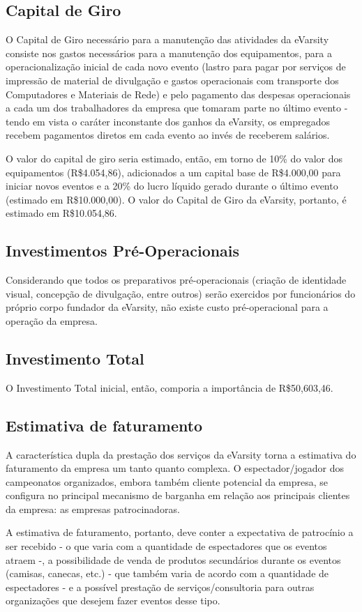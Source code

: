\documentclass[a4paper, 12pt]{paper}
\begin{document}
\subsection{Capital de Giro}
O Capital de Giro necessário para a manutenção das atividades da eVarsity consiste nos gastos necessários para a manutenção dos equipamentos, para a operacionalização inicial de cada novo evento (lastro para pagar por serviços de impressão de material de divulgação e gastos operacionais com transporte dos Computadores e Materiais de Rede) e pelo pagamento das despesas operacionais a cada um dos trabalhadores da empresa que tomaram parte no último evento - tendo em vista o caráter inconstante dos ganhos da eVarsity, os empregados recebem pagamentos diretos em cada evento ao invés de receberem salários. 

O valor do capital de giro seria estimado, então, em torno de 10\% do valor dos equipamentos (R\$4.054,86), adicionados a um capital base de R\$4.000,00 para iniciar novos eventos e a 20\% do lucro líquido gerado durante o último evento (estimado em R\$10.000,00). O valor do Capital de Giro da eVarsity, portanto, é estimado em R\$10.054,86.
\subsection{Investimentos Pré-Operacionais}
Considerando que todos os preparativos pré-operacionais (criação de identidade visual, concepção de divulgação, entre outros) serão exercidos por funcionários do próprio corpo fundador da eVarsity, não existe custo pré-operacional para a operação da empresa.
\subsection{Investimento Total}
O Investimento Total inicial, então, comporia a importância de R\$50,603,46.
\subsection{Estimativa de faturamento}
A característica dupla da prestação dos serviços da eVarsity torna a estimativa do faturamento da empresa um tanto quanto complexa. O espectador/jogador dos campeonatos organizados, embora também cliente potencial da empresa, se configura no principal mecanismo de barganha em relação aos principais clientes da empresa: as empresas patrocinadoras. 

A estimativa de faturamento, portanto, deve conter a expectativa de patrocínio a ser recebido - o que varia com a quantidade de espectadores que os eventos atraem -, a possibilidade de venda de produtos secundários durante os eventos (camisas, canecas, etc.) - que também varia de acordo com a quantidade de espectadores - e a possível prestação de serviços/consultoria para outras organizações que desejem fazer eventos desse tipo.
\end{document}
